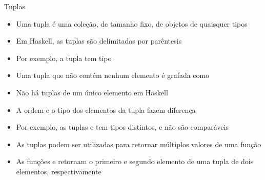 \begin{frame}[fragile]{Tuplas}

    \begin{itemize}
        \item Uma tupla é uma coleção, de tamanho fixo, de objetos de quaisquer tipos 

        \item Em Haskell, as tuplas são delimitadas por parêntesis

        \item Por exemplo, a tupla  tem tipo

        \item Uma tupla que não contém nenhum elemento é grafada como 

        \item Não há tuplas de um único elemento em Haskell

        \item A ordem e o tipo dos elementos da tupla fazem diferença

        \item Por exemplo, as tuplas  e 
            tem tipos distintos, e não são comparáveis

        \item As tuplas podem ser utilizadas para retornar múltiplos valores de uma função

        \item As funções  e  retornam o primeiro e segundo
            elemento de uma tupla de dois elementos, respectivamente
    \end{itemize}

\end{frame}

